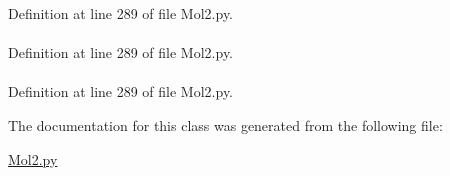 \-Definition at line 289 of file \-Mol2.\-py.

\hypertarget{classforcebalance_1_1Mol2_1_1mol2_a1a36cf6ccaea1f56aab925d994350f74}{
\paragraph[{num\-\_\-sets}]{}}\label{classforcebalance_1_1Mol2_1_1mol2_a1a36cf6ccaea1f56aab925d994350f74}


\-Definition at line 289 of file \-Mol2.\-py.

\hypertarget{classforcebalance_1_1Mol2_1_1mol2_ae7ec89e16d022a11bd0f8e663c303ead}{
\paragraph[{num\-\_\-subst}]{}}\label{classforcebalance_1_1Mol2_1_1mol2_ae7ec89e16d022a11bd0f8e663c303ead}


\-Definition at line 289 of file \-Mol2.\-py.



\-The documentation for this class was generated from the following file\-:\begin{DoxyCompactItemize}
\item 
\hyperlink{Mol2_8py}{\-Mol2.\-py}\end{DoxyCompactItemize}
